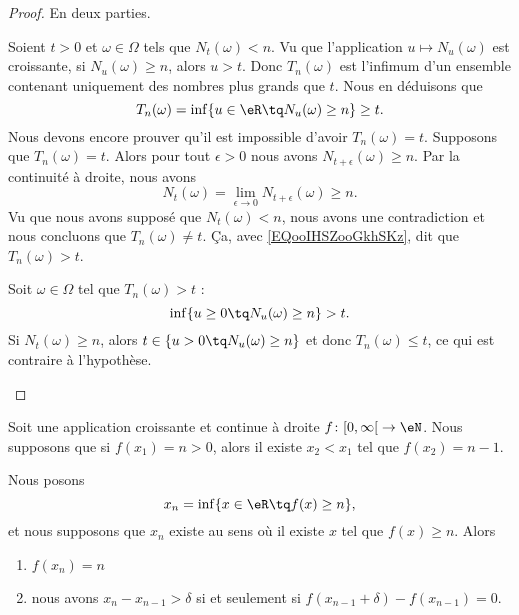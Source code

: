 \begin{proof}
	En deux parties.
	\begin{subproof}
		\spitem[\( \{ N_t<n \}\subset\{ T_n>t \}\)]
		Soient \( t>0\) et \( \omega\in \Omega\) tels que \( N_t(\omega)<n\). Vu que l'application \( u\mapsto N_u(\omega)\) est croissante, si \( N_u(\omega)\geq n\), alors \( u> t\). Donc \( T_n(\omega)\) est l'infimum d'un ensemble contenant uniquement des nombres plus grands que \( t\). Nous en déduisons que
		\begin{equation}		\label{EQooIHSZooGkhSKz}
			T_n(\omega)=\inf\{ u\in \eR\tq N_u(\omega)\geq n \}\geq t.
		\end{equation}
		Nous devons encore prouver qu'il est impossible d'avoir \( T_n(\omega)=t\). Supposons que \( T_n(\omega)=t\). Alors pour tout \( \epsilon>0\) nous avons \( N_{t+\epsilon}(\omega)\geq n\). Par la continuité à droite, nous avons
		\begin{equation}
			N_t(\omega)=\lim_{\epsilon\to 0}N_{t+\epsilon}(\omega)\geq n.
		\end{equation}
		Vu que nous avons supposé que \( N_t(\omega)<n\), nous avons une contradiction et nous concluons que \( T_n(\omega)\neq t\). Ça, avec \eqref{EQooIHSZooGkhSKz}, dit que \( T_n(\omega)>t\).

		\spitem[\( \{ T_n>t \}\subset\{ N_t<n \}\)]
		Soit \( \omega\in \Omega\) tel que \( T_n(\omega)>t\) :
		\begin{equation}
			\inf\{ u\geq 0\tq N_u(\omega)\geq n \}>t.
		\end{equation}
		Si \( N_t(\omega)\geq n\), alors \( t\in\{ u>0\tq  N_u(\omega)\geq n\}\) et donc \( T_n(\omega)\leq t\), ce qui est contraire à l'hypothèse.
	\end{subproof}
\end{proof}


\begin{lemma}	\label{LEMooYKOIooAUuivH}
	Soit une application croissante et continue à droite \(f \colon \mathopen[ 0,\infty\mathclose[\to \eN  \). Nous supposons que si \( f(x_1)=n>0\), alors il existe \( x_2<x_1\) tel que \( f(x_2)=n-1\).

	Nous posons
	\begin{equation}
		x_n=\inf\{ x\in \eR\tq f(x)\geq n \},
	\end{equation}
	et nous supposons que \( x_n\) existe au sens où il existe \( x\) tel que \( f(x)\geq n\). Alors
	\begin{enumerate}
		\item		\label{ITEMooHSCEooKVtXYn}
		      \( f(x_n)=n\)
		\item
		      nous avons \( x_n-x_{n-1}>\delta\) si et seulement si \( f(x_{n-1}+\delta)-f(x_{n-1})=0\).
	\end{enumerate}
\end{lemma}


